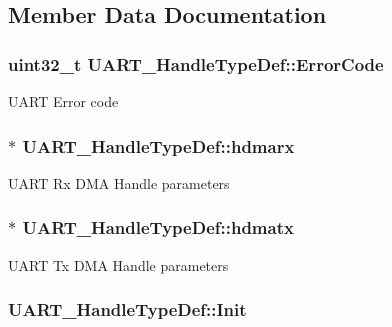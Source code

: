\subsection{Member Data Documentation}
\hypertarget{struct_u_a_r_t___handle_type_def_ab8ce937b317c505d83b31c94d5af6db8}{
\subsubsection[{Error\-Code}]{ uint32\-\_\-t U\-A\-R\-T\-\_\-\-Handle\-Type\-Def\-::\-Error\-Code}}\label{struct_u_a_r_t___handle_type_def_ab8ce937b317c505d83b31c94d5af6db8}
U\-A\-R\-T Error code \hypertarget{struct_u_a_r_t___handle_type_def_a11b3ba9d871b8a607b5eb00bf468e3ef}{
\subsubsection[{hdmarx}]{$\ast$ U\-A\-R\-T\-\_\-\-Handle\-Type\-Def\-::hdmarx}}\label{struct_u_a_r_t___handle_type_def_a11b3ba9d871b8a607b5eb00bf468e3ef}
U\-A\-R\-T Rx D\-M\-A Handle parameters \hypertarget{struct_u_a_r_t___handle_type_def_a995e0ff8dd7c987cae31b3e153166acb}{
\subsubsection[{hdmatx}]{$\ast$ U\-A\-R\-T\-\_\-\-Handle\-Type\-Def\-::hdmatx}}\label{struct_u_a_r_t___handle_type_def_a995e0ff8dd7c987cae31b3e153166acb}
U\-A\-R\-T Tx D\-M\-A Handle parameters \hypertarget{struct_u_a_r_t___handle_type_def_a98a8e13e0b5a227d31ab0a4b346cf4df}{
\subsubsection[{Init}]{ U\-A\-R\-T\-\_\-\-Handle\-Type\-Def\-::\-Init}}\label{struct_u_a_r_t___handle_type_def_a98a8e13e0b5a227d31ab0a4b346cf4df}
